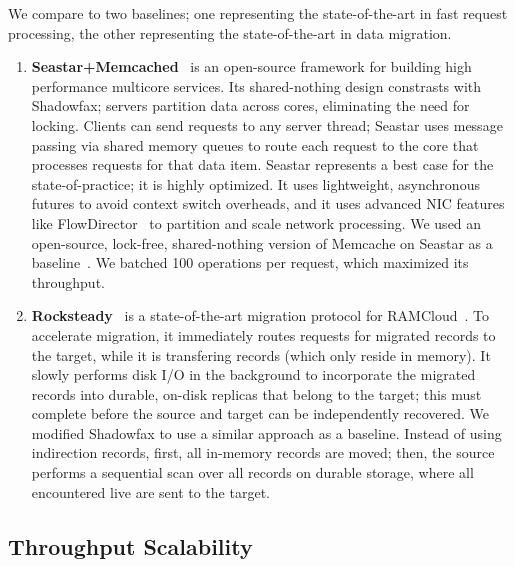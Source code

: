 We compare to two baselines; one representing the
state-of-the-art in fast request processing, the other representing the
state-of-the-art in data migration.

\begin{enumerate}
\item \textbf{Seastar+Memcached}~\cite{seastar}
is an open-source framework for building high
performance multicore services.
%
Its shared-nothing design constrasts with Shadowfax;
servers partition data across cores, eliminating the need for locking.
%
Clients can send requests to any server thread;
Seastar uses message passing via shared memory queues to route
each request to the core that processes requests for that data item.
%
Seastar represents a best case for the state-of-practice; it is highly optimized.
%
It uses lightweight, asynchronous futures to avoid
context switch overheads, and it uses advanced NIC features like
FlowDirector~\cite{flow-director} to partition and scale network processing.
%
We used an open-source, lock-free, shared-nothing version of
Memcache on Seastar as a baseline~\cite{seastar-apps}.
%
We batched 100 operations per request, which maximized its throughput.

\item \textbf{Rocksteady}~\cite{rocksteady} is a state-of-the-art migration
protocol for RAMCloud~\cite{ramcloud}.
%
To accelerate migration, it immediately routes requests for migrated records
to the target, while it is transfering records (which only reside in memory).
%
It slowly performs disk I/O in the background to incorporate the migrated records
into durable, on-disk replicas that belong to the target; this must complete
before the source and target can be independently recovered.
%
%
We modified Shadowfax to use a similar approach as a baseline.
%
Instead of using indirection records, first, all in-memory records are moved;
then, the source performs a sequential scan over all records on durable
storage, where all encountered live are sent to the target.
%
%
\end{enumerate}

\subsection{Throughput Scalability}
\label{sec:eval:clients}

